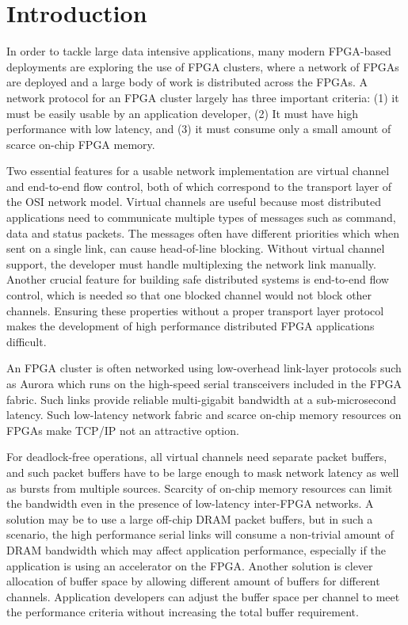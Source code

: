 \section{Introduction}

In order to tackle large data intensive applications, many modern FPGA-based
deployments are exploring the use of FPGA clusters, where a network of FPGAs are
deployed and a large body of work is distributed across the FPGAs.  A network
protocol for an FPGA cluster largely has three important criteria: (1) it must
be easily usable by an application developer, (2) It must have high performance
with low latency, and (3) it must consume only a small amount of scarce on-chip
FPGA memory.

Two essential features for a usable network implementation are virtual channel
and end-to-end flow control, both of which correspond to the transport layer of
the OSI network model. Virtual channels are useful because most distributed
applications need to communicate multiple types of messages such as command,
data and status packets. The messages often have different priorities which when
sent on a single link, can cause head-of-line blocking. Without virtual channel
support, the developer must handle multiplexing the network link manually.
Another crucial feature for building safe distributed systems is end-to-end flow
control, which is needed so that one blocked channel would not block other
channels.  Ensuring these properties without a proper transport layer protocol
makes the development of high performance distributed FPGA applications
difficult. 

An FPGA cluster is often networked using low-overhead link-layer protocols such
as Aurora which runs on the high-speed serial transceivers included in the FPGA
fabric.  Such links provide reliable multi-gigabit bandwidth at a
sub-microsecond latency. Such low-latency network fabric and scarce on-chip
memory resources on FPGAs make TCP/IP not an attractive option.

For deadlock-free operations, all virtual channels need separate packet buffers,
and such packet buffers have to be large enough to mask network latency as well
as bursts from multiple sources. Scarcity of on-chip memory resources can limit
the bandwidth even in the presence of low-latency inter-FPGA networks.  A
solution may be to use a large off-chip DRAM packet buffers, but in such a
scenario, the high performance serial links will consume a non-trivial amount of
DRAM bandwidth which may affect application performance, especially if the
application is using an accelerator on the FPGA.  Another solution is clever
allocation of buffer space by allowing different amount of buffers for different
channels. Application developers can adjust the buffer space per channel to meet
the performance criteria without increasing the total buffer requirement.

